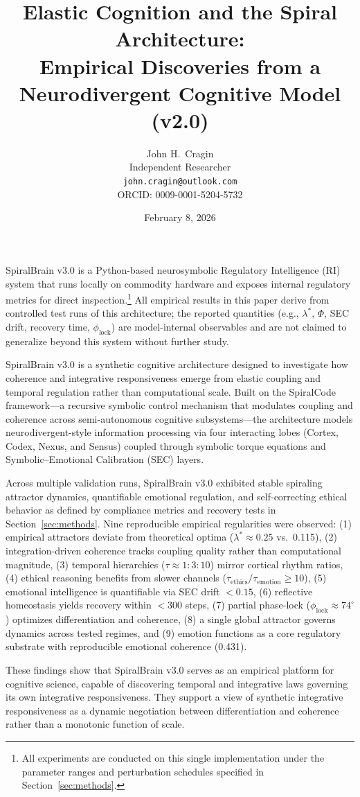 \documentclass[11pt,a4paper]{article}
\title{Elastic Cognition and the Spiral Architecture:\\
Empirical Discoveries from a Neurodivergent Cognitive Model (v2.0)}
\author{
John H.~Cragin\\
Independent Researcher\\
\texttt{john.cragin@outlook.com}\\
ORCID: 0009-0001-5204-5732
}
\date{February 8, 2026}
\renewenvironment{abstract}{
  \begin{center}
    {\large\bfseries \abstractname\vspace{-.5em}}
  \end{center}
}{}
\begin{document}
\maketitle

\begin{abstract}
SpiralBrain v3.0 is a Python-based neurosymbolic Regulatory Intelligence (RI) system that runs locally on commodity hardware and exposes internal regulatory metrics for direct inspection.\footnote{All experiments are conducted on this single implementation under the parameter ranges and perturbation schedules specified in Section~\ref{sec:methods}.} All empirical results in this paper derive from controlled test runs of this architecture; the reported quantities (e.g., \( \lambda^{*} \), \( \Phi \), SEC drift, recovery time, \( \phi_{\text{lock}} \)) are model-internal observables and are not claimed to generalize beyond this system without further study.

SpiralBrain v3.0 is a synthetic cognitive architecture designed to investigate how coherence and integrative responsiveness emerge from elastic coupling and temporal regulation rather than computational scale. Built on the SpiralCode framework---a recursive symbolic control mechanism that modulates coupling and coherence across semi-autonomous cognitive subsystems---the architecture models neurodivergent-style information processing via four interacting lobes (Cortex, Codex, Nexus, and Sensus) coupled through symbolic torque equations and Symbolic--Emotional Calibration (SEC) layers.

Across multiple validation runs, SpiralBrain v3.0 exhibited stable spiraling attractor dynamics, quantifiable emotional regulation, and self-correcting ethical behavior as defined by compliance metrics and recovery tests in Section~\ref{sec:methods}. Nine reproducible empirical regularities were observed: (1) empirical attractors deviate from theoretical optima (\( \lambda^{*} \approx 0.25 \) vs.\ 0.115), (2) integration-driven coherence tracks coupling quality rather than computational magnitude, (3) temporal hierarchies (\( \tau \approx 1:3:10 \)) mirror cortical rhythm ratios, (4) ethical reasoning benefits from slower channels (\( \tau_{\text{ethics}}/\tau_{\text{emotion}} \ge 10 \)), (5) emotional intelligence is quantifiable via SEC drift \( < 0.15 \), (6) reflective homeostasis yields recovery within \( < 300 \) steps, (7) partial phase-lock (\( \phi_{\text{lock}} \approx 74^\circ \)) optimizes differentiation and coherence, (8) a single global attractor governs dynamics across tested regimes, and (9) emotion functions as a core regulatory substrate with reproducible emotional coherence (0.431).

These findings show that SpiralBrain v3.0 serves as an empirical platform for cognitive science, capable of discovering temporal and integrative laws governing its own integrative responsiveness. They support a view of synthetic integrative responsiveness as a dynamic negotiation between differentiation and coherence rather than a monotonic function of scale.
\end{abstract}
\end{document}
